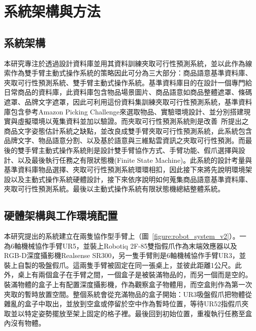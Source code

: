 \chapter{系統架構與方法}
\label{chapter:system}



\section{系統架構}
\label{sec:systemarchi}
本研究專注於透過設計資料庫並用其資料訓練夾取可行性預測系統，並以此作為線索作為雙手臂主動式操作系統的策略因此可分為三大部分：商品語意基準資料庫、夾取可行性預測系統、雙手臂主動式操作系統。基準資料庫目的在設計一個專門給日常商品的資料庫，此資料庫包含物品場景圖片、商品語意如商品整體遮罩、條碼遮罩、品牌文字遮罩，因此可利用這份資料集訓練夾取可行性預測系統，基準資料庫包含參考Amazon Picking Challenge來選取物品、實驗環境設計、並分別搭建現實與虛擬環境以蒐集資料並加以驗證。而夾取可行性預測系統則是改善~\cite{peterthesis}所提出之商品文字姿態估計系統之缺點，並改良成雙手臂夾取可行性預測系統，此系統包含品牌文字、物品語意分割、以及基於語意與三維點雲資訊之夾取可行性預測。而最後的雙手臂主動式操作系統則是設計雙手臂協作方式、手臂功能、假爪選擇與設計、以及最後執行任務之有限狀態機(Finite State Machine)。此系統的設計考量與基準資料庫物品選擇、夾取可行性預測系統環環相扣，因此接下來將先說明環境架設以及主動式操作系統硬體設計，接下來依序說明如何蒐集商品語意基準資料庫、夾取可行性預測系統。最後以主動式操作系統有限狀態機總結整體系統。

\section{硬體架構與工作環境配置}
本研究提出的系統建立在兩隻協作型手臂上（圖~\ref{figure:robot_system_v2}）。一為6軸機械協作手臂UR5，並裝上Robotiq 2F-85雙指假爪作為末端效應器以及RGB-D深度攝影機Realsense SR300，另一隻手臂則是6軸機械協作手臂UR3，並裝上自製的吸盤假爪。這兩隻手臂被固定在同一張桌上，並彼此距離1公尺。此外，桌上有兩個盒子在手臂之間，一個盒子是被裝滿物品的，而另一個而是空的。裝滿物體的盒子上有配置深度攝影機，作為觀察盒子物體用，而空盒則作為第一次夾取的暫時放置空間。整個系統會從充滿物品的盒子開始：UR3吸盤假爪把物體從雜亂的盒子中取出，並放到空盒或停留於空中作為暫時位置，等待UR52指假爪夾取並以特定姿勢擺放至架上固定的格子裡。最後回到初始位置，重複執行任務至盒內沒有物體。

